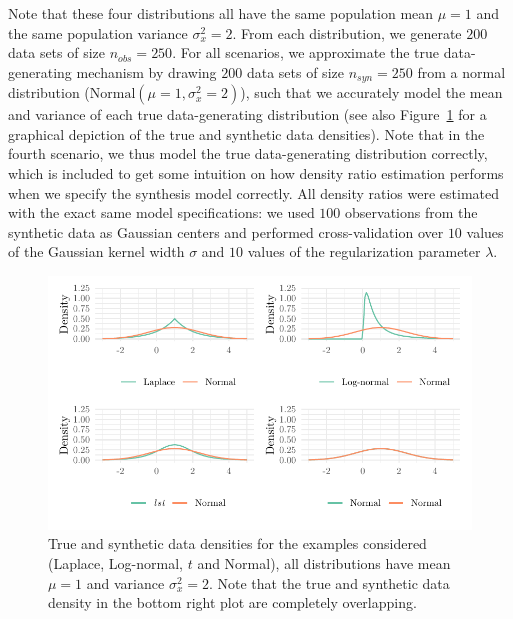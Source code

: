 \documentclass[
]{template/style/uneceart}
\begin{document}
Note that these four distributions all have the same population mean
\(\mu = 1\) and the same population variance \(\sigma^2_x = 2\). From
each distribution, we generate \(200\) data sets of size
\(n_{obs} = 250\). For all scenarios, we approximate the true
data-generating mechanism by drawing \(200\) data sets of size
\(n_{syn} = 250\) from a normal distribution
(\(\text{Normal}(\mu = 1, \sigma^2_x = 2)\)), such that we accurately
model the mean and variance of each true data-generating distribution
(see also Figure~\ref{fig-densities} for a graphical depiction of the
true and synthetic data densities). Note that in the fourth scenario, we
thus model the true data-generating distribution correctly, which is
included to get some intuition on how density ratio estimation performs
when we specify the synthesis model correctly. All density ratios were
estimated with the exact same model specifications: we used \(100\)
observations from the synthetic data as Gaussian centers and performed
cross-validation over \(10\) values of the Gaussian kernel width
\(\sigma\) and \(10\) values of the regularization parameter
\(\lambda\).

\begin{figure}[t]

{\centering \includegraphics[width=1\textwidth,height=\textheight]{dr-utility-volker-kesteren_files/figure-pdf/fig-densities-1.pdf}

}

\caption{\label{fig-densities}True and synthetic data densities for the
examples considered (Laplace, Log-normal, \(t\) and Normal), all
distributions have mean \(\mu = 1\) and variance \(\sigma^2_x = 2\).
Note that the true and synthetic data density in the bottom right plot
are completely overlapping.}

\end{figure}
\end{document}
